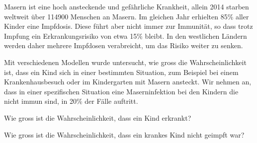 Masern ist eine hoch ansteckende und gefährliche Krankheit,
allein 2014 starben weltweit über 114900 Menschen an Masern.
Im gleichen Jahr erhielten 85\% aller Kinder eine Impfdosis.
Diese führt aber nicht immer zur Immunität, so dass trotz Impfung
ein Erkrankungsrisiko von etwa 15\% bleibt.
In den westlichen Ländern werden daher mehrere Impfdosen verabreicht,
um das Risiko weiter zu senken.

Mit verschiedenen Modellen wurde untersucht, wie gross die Wahrscheinlichkeit
ist, dass ein Kind sich in einer bestimmten Situation, zum Beispiel
bei einem Krankenhausbesuch oder im Kindergarten mit Masern ansteckt.
Wir nehmen an, dass in einer spezifischen Situation eine Maserninfektion
bei den Kindern die nicht immun sind, in 20\% der Fälle auftritt.

\begin{teilaufgaben}
\item
Wie gross ist die Wahrscheinlichkeit, dass ein Kind erkrankt?
\item
Wie gross ist die Wahrscheinlichkeit, dass ein krankes Kind nicht
geimpft war?
\end{teilaufgaben}


